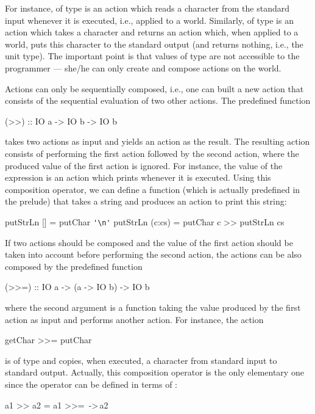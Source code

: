 For instance, 
of type  is an action
which reads a character from the standard input whenever it is executed,
i.e., applied to a world. Similarly, 
of type  is an action which takes a character
and returns an action which, when
applied to a world, puts this character to the standard output
(and returns nothing, i.e., the unit type).
The important point is that values of type  are
not accessible to the programmer --- she/he can only create
and compose actions on the world.

Actions can only be sequentially composed, i.e., one can built a new
action that consists of the sequential evaluation of two
other actions. The predefined function \pindex{>>}
\begin{prog}
(>>) :: IO a -> IO b -> IO b
\end{prog}
takes two actions as input and yields an action as the result.
The resulting action consists of performing the first action followed
by the second action, where the produced value of the first action is
ignored. For instance, the value of the expression
 is an action which prints
 whenever it is executed. Using this composition operator,
we can define a function 
(which is actually predefined in the prelude)
that takes a string and produces an action to print this string:
\begin{prog}
putStrLn []     = putChar \verb|'\n'|
putStrLn (c:cs) = putChar c >> putStrLn cs
\end{prog}
If two actions should be composed and the
value of the first action should be taken into account
before performing the second action, the actions can be also composed by
the predefined function\pindex{>>=}
\begin{prog}
(>>=) :: IO a -> (a -> IO b) -> IO b
\end{prog}
where the second argument is a function taking the value produced
by the first action as input and performs another action.
For instance, the action
\begin{prog}
getChar >>= putChar
\end{prog}
is of type  and copies, when executed, a character
from standard input to standard output.
Actually, this composition operator is the only elementary one
since the operator \ccode{>>} can be defined in terms of \ccode{>>=}:
\begin{prog}
a1 >> a2  =  a1 >>= \,->\,a2
\end{prog}
